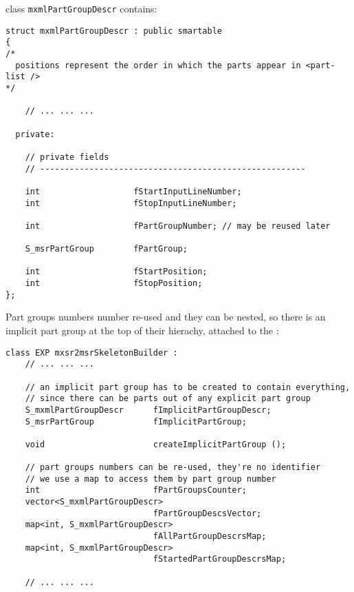 class   {\tt mxmlPartGroupDescr} contains:
\begin{lstlisting}[language=CPlusPlus]
struct mxmlPartGroupDescr : public smartable
{
/*
  positions represent the order in which the parts appear in <part-list />
*/

	// ... ... ...

  private:

    // private fields
    // ------------------------------------------------------

    int                   fStartInputLineNumber;
    int                   fStopInputLineNumber;

    int                   fPartGroupNumber; // may be reused later

    S_msrPartGroup        fPartGroup;

    int                   fStartPosition;
    int                   fStopPosition;
};
\end{lstlisting}

Part groups numbers number re-used and they can be nested, so there is an implicit part group at the top of their hierachy, attached to the :
\begin{lstlisting}[language=CPlusPlus]
class EXP mxsr2msrSkeletonBuilder :
	// ... ... ...

    // an implicit part group has to be created to contain everything,
    // since there can be parts out of any explicit part group
    S_mxmlPartGroupDescr      fImplicitPartGroupDescr;
    S_msrPartGroup            fImplicitPartGroup;

    void                      createImplicitPartGroup ();

    // part groups numbers can be re-used, they're no identifier
    // we use a map to access them by part group number
    int                       fPartGroupsCounter;
    vector<S_mxmlPartGroupDescr>
                              fPartGroupDescsVector;
    map<int, S_mxmlPartGroupDescr>
                              fAllPartGroupDescrsMap;
    map<int, S_mxmlPartGroupDescr>
                              fStartedPartGroupDescrsMap;

	// ... ... ...
\end{lstlisting}

